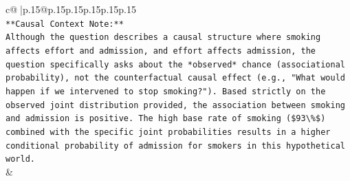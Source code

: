 \documentclass{article}
\begin{document}
{\begin{supertabular}{c@{$\;$}|p{.15\linewidth}@{}p{.15\linewidth}p{.15\linewidth}p{.15\linewidth}p{.15\linewidth}p{.15\linewidth}}
{{{\\ 
\texttt{**Causal Context Note:**} \\
\texttt{Although the question describes a causal structure where smoking affects effort and admission, and effort affects admission, the question specifically asks about the *observed* chance (associational probability), not the counterfactual causal effect (e.g., "What would happen if we intervened to stop smoking?"). Based strictly on the observed joint distribution provided, the association between smoking and admission is positive. The high base rate of smoking (\$93\textbackslash{}\%\$) combined with the specific joint probabilities results in a higher conditional probability of admission for smokers in this hypothetical world.} \\
            }
        }
    }
    & \\ \\


\end{supertabular}}
\end{document}
